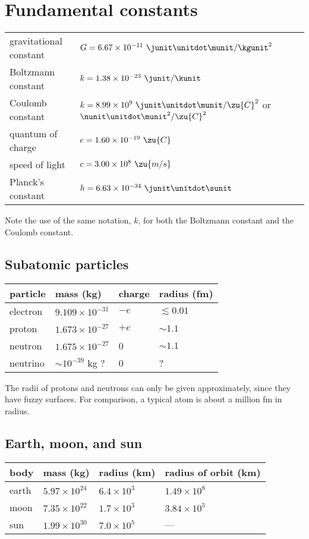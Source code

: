 \chapter{Fundamental constants}
\noindent\begin{tabular}{|l|l|}
\hline
gravitational constant	& $G=6.67\times10^{-11}\ \junit\unitdot\munit/\kgunit^2$ \\
Boltzmann constant      & $k=1.38\times10^{-23}\ \junit/\kunit$\\
Coulomb constant	& $k=8.99\times10^9\ \junit\unitdot\munit/\zu{C}^2$ or $\nunit\unitdot\munit^2/\zu{C}^2$ \\
quantum of charge	& $e=1.60\times10^{-19}\ \zu{C}$ \\
speed of light	& $c=3.00\times10^8\ \zu{m/s}$ \\
Planck's constant	& $h=6.63\times10^{-34}\ \junit\unitdot\sunit$ \\
\hline
\end{tabular}

\noindent Note the use of the same notation, $k$, for both the Boltzmann constant and the Coulomb constant.

\section{Subatomic particles}\label{subatomicparticlesdata}
\noindent\begin{tabular}{|l|l|l|l|}
\hline
particle	& mass (kg)	& charge	& radius (fm) \\
\hline
electron	& $9.109\times10^{-31}$	& $-e$	& $\lesssim0.01$\\
proton	& $1.673\times10^{-27}$	& $+e$	& $\sim{}1.1$\\
neutron	& $1.675\times10^{-27}$	& 0		& $\sim{}1.1$\\
neutrino	& $\sim10^{-39}$ kg ?	& 0		& 	?\\
\hline
\end{tabular}

\noindent{}The radii of protons and neutrons can only be given
approximately, since they have fuzzy surfaces. For
comparison, a typical atom is about a million fm in radius.




\section{Earth, moon, and sun}
\noindent\begin{tabular}{|l|l|l|l|}
\hline
body		&	mass (kg)		&	radius (km)	&	radius of orbit (km) \\
\hline
earth	&	$5.97\times10^{24}$	&	$6.4\times10^{3}$	&	$1.49\times10^{8}$\\
moon	&	$7.35\times10^{22}$	&	$1.7\times10^{3}$	&	$3.84\times10^{5}$\\
sun		&	$1.99\times10^{30}$	&	$7.0\times10^{5}$	&	---\\
\hline
\end{tabular}


